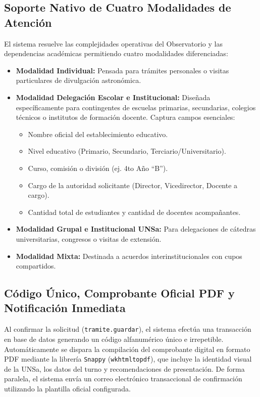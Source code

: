 \subsection{Soporte Nativo de Cuatro Modalidades de Atención}
El sistema resuelve las complejidades operativas del Observatorio y las dependencias académicas permitiendo cuatro modalidades diferenciadas:
\begin{itemize}
    \item \textbf{Modalidad Individual:} Pensada para trámites personales o visitas particulares de divulgación astronómica.
    \item \textbf{Modalidad Delegación Escolar e Institucional:} Diseñada específicamente para contingentes de escuelas primarias, secundarias, colegios técnicos o institutos de formación docente. Captura campos esenciales:
        \begin{itemize}
            \item Nombre oficial del establecimiento educativo.
            \item Nivel educativo (Primario, Secundario, Terciario/Universitario).
            \item Curso, comisión o división (ej. 4to Año ``B'').
            \item Cargo de la autoridad solicitante (Director, Vicedirector, Docente a cargo).
            \item Cantidad total de estudiantes y cantidad de docentes acompañantes.
        \end{itemize}
    \item \textbf{Modalidad Grupal e Institucional UNSa:} Para delegaciones de cátedras universitarias, congresos o visitas de extensión.
    \item \textbf{Modalidad Mixta:} Destinada a acuerdos interinstitucionales con cupos compartidos.
\end{itemize}

\subsection{Código Único, Comprobante Oficial PDF y Notificación Inmediata}
Al confirmar la solicitud (\texttt{tramite.guardar}), el sistema efectúa una transacción en base de datos generando un código alfanumérico único e irrepetible. Automáticamente se dispara la compilación del comprobante digital en formato PDF mediante la librería \texttt{Snappy} (\texttt{wkhtmltopdf}), que incluye la identidad visual de la UNSa, los datos del turno y recomendaciones de presentación. De forma paralela, el sistema envía un correo electrónico transaccional de confirmación utilizando la plantilla oficial configurada.

